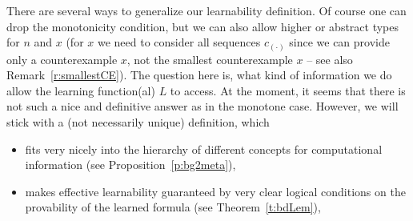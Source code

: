 There are several ways to generalize our learnability definition. 
Of course one can drop the monotonicity condition, but we can also allow higher or abstract types for $n$ and $x$ (for $x$ we need to consider all sequences $c_{(\cdot)}$ since we can provide only a counterexample $x$, not the smallest counterexample $x$ -- see also Remark~\ref{r:smallestCE}). The question here is, what kind of information we do allow the learning function(al) $L$ to access. At the moment, it seems that there is not such a nice and definitive answer as in the monotone case. However, we will stick with a (not necessarily unique) definition, which
\begin{itemize} 
\item fits very nicely into the hierarchy of different concepts for computational information (see Proposition~\ref{p:bg2meta}),
\item makes effective learnability guaranteed by very clear logical conditions on the provability of the learned formula (see Theorem~\ref{t:bdLem}),
\end{itemize} 

